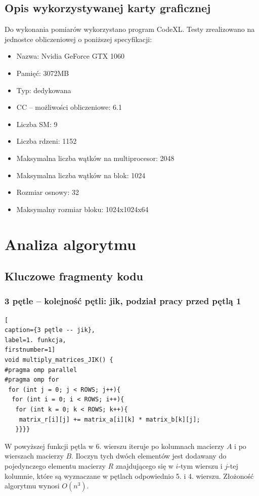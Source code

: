 \documentclass{article}
\begin{document}
\subsection{Opis wykorzystywanej karty graficznej}
Do wykonania pomiarów wykorzystano program CodeXL. Testy zrealizowano na jednostce obliczeniowej o poniższej specyfikacji:
\begin{itemize}
\item Nazwa: Nvidia GeForce GTX 1060
\item Pamięć: 3072MB
\item Typ: dedykowana
\item CC – możliwości obliczeniowe: 6.1
\item Liczba SM: 9
\item Liczba rdzeni: 1152
\item Maksymalna liczba wątków na multiprocesor: 2048
\item Maksymalna liczba wątków na blok: 1024
\item Rozmiar osnowy: 32
\item Maksymalny rozmiar bloku: 1024x1024x64
\end{itemize}

\section{Analiza algorytmu}
\subsection{Kluczowe fragmenty kodu}
\subsubsection{3 pętle -- kolejność pętli: jik, podział pracy przed pętlą 1}
\begin{lstlisting}[
caption={3 pętle -- jik},
label=1. funkcja,
firstnumber=1]
void multiply_matrices_JIK() {
#pragma omp parallel
#pragma omp for 
 for (int j = 0; j < ROWS; j++){
  for (int i = 0; i < ROWS; i++){
   for (int k = 0; k < ROWS; k++){
    matrix_r[i][j] += matrix_a[i][k] * matrix_b[k][j];
   }}}}
\end{lstlisting}

W powyższej funkcji pętla w 6. wierszu iteruje po kolumnach macierzy $A$ i po wierszach macierzy $B$. Iloczyn tych dwóch elementów jest dodawany do pojedynczego elementu macierzy $R$ znajdującego się w $i$-tym wierszu i $j$-tej kolumnie, które są wyznaczane w pętlach odpowiednio 5. i 4. wierszu. Złożoność algorytmu wynosi $O(n^3)$.
\end{document}
